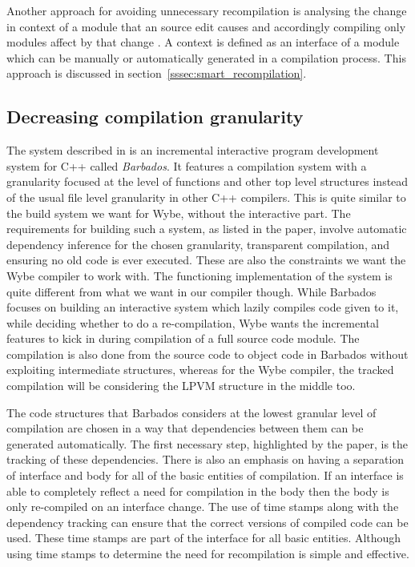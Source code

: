 Another approach for avoiding unnecessary recompilation is analysing the change
in context of a module that an source edit causes and accordingly compiling
only modules affect by that change \citep{tichy_recomp_context}. A context is
defined as an interface of a module which can be manually or automatically
generated in a compilation process. This approach is discussed in
section~\ref{sssec:smart_recompilation}.


\subsection{Decreasing compilation granularity}
\label{sssec:cpp_compiler}

The system described in \cite{cpp_compiler} is an incremental interactive
program development system for C++ called \textit{Barbados}. It features a
compilation system with a granularity focused at the level of functions and
other top level structures instead of the usual file level granularity in other
C++ compilers. This is quite similar to the build system we want for Wybe,
without the interactive part. The requirements for building such a system, as
listed in the paper, involve automatic dependency inference for the chosen
granularity, transparent compilation, and ensuring no old code is ever
executed. These are also the constraints we want the Wybe compiler to work
with. The functioning implementation of the system is quite different from what
we want in our compiler though. While Barbados focuses on building an
interactive system which lazily compiles code given to it, while deciding
whether to do a re-compilation, Wybe wants the incremental features to kick in
during compilation of a full source code module. The compilation is also done
from the source code to object code in Barbados without exploiting intermediate
structures, whereas for the Wybe compiler, the tracked compilation will be
considering the LPVM structure in the middle too.

The code structures that Barbados considers at the lowest granular level of
compilation are chosen in a way that dependencies between them can be generated
automatically. The first necessary step, highlighted by the paper, is the
tracking of these dependencies. There is also an emphasis on having a
separation of interface and body for all of the basic entities of
compilation. If an interface is able to completely reflect a need for
compilation in the body then the body is only re-compiled on an interface
change. The use of time stamps along with the dependency tracking can ensure
that the correct versions of compiled code can be used. These time stamps are
part of the interface for all basic entities. Although using time stamps to
determine the need for recompilation is simple and effective.

